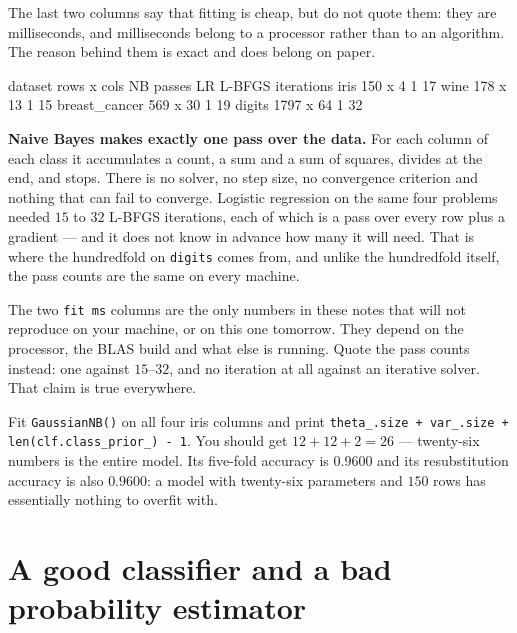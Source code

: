 \documentclass[11pt]{article}
\begin{document}
The last two columns say that fitting is cheap, but do not quote them: they
are milliseconds, and milliseconds belong to a processor rather than to an
algorithm. The reason behind them is exact and does belong on paper.

\begin{codeout}
   dataset            rows x cols  NB passes  LR L-BFGS iterations
   iris                   150 x 4          1                    17
   wine                  178 x 13          1                    15
   breast_cancer         569 x 30          1                    19
   digits               1797 x 64          1                    32
\end{codeout}

\textbf{Naive Bayes makes exactly one pass over the data.} For each column of
each class it accumulates a count, a sum and a sum of squares, divides at the
end, and stops. There is no solver, no step size, no convergence criterion and
nothing that can fail to converge. Logistic regression on the same four
problems needed $15$ to $32$ L-BFGS iterations, each of which is a pass over
every row plus a gradient --- and it does not know in advance how many it will
need. That is where the hundredfold on \texttt{digits} comes from, and unlike
the hundredfold itself, the pass counts are the same on every machine.

\begin{caution}
The two \texttt{fit ms} columns are the only numbers in these notes that will
not reproduce on your machine, or on this one tomorrow. They depend on the
processor, the BLAS build and what else is running. Quote the pass counts
instead: one against $15$--$32$, and no iteration at all against an iterative
solver. That claim is true everywhere.
\end{caution}

\begin{tryit}
Fit \texttt{GaussianNB()} on all four iris columns and print
\texttt{theta\_.size + var\_.size + len(clf.class\_prior\_) - 1}. You should
get $12 + 12 + 2 = 26$ --- twenty-six numbers is the entire model. Its
five-fold accuracy is $0.9600$ and its resubstitution accuracy is also
$0.9600$: a model with twenty-six parameters and $150$ rows has essentially
nothing to overfit with.
\end{tryit}

\section{A good classifier and a bad probability estimator}
\label{sec:calib}
\end{document}
